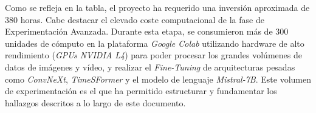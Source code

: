 Como se refleja en la tabla, el proyecto ha requerido una inversión aproximada de 380 horas. Cabe destacar el elevado coste computacional de la fase de Experimentación Avanzada. Durante esta etapa, se consumieron más de 300 unidades de cómputo en la plataforma \textit{Google Colab} utilizando hardware de alto rendimiento (\textit{GPUs NVIDIA L4}) para poder procesar los grandes volúmenes de datos de imágenes y vídeo, y realizar el \textit{Fine-Tuning} de arquitecturas pesadas como \textit{ConvNeXt}, \textit{TimeSFormer} y el modelo de lenguaje \textit{Mistral-7B}. Este volumen de experimentación es el que ha permitido estructurar y fundamentar los hallazgos descritos a lo largo de este documento. 